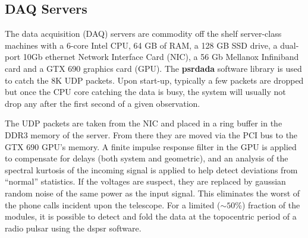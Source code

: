 \subsection {DAQ Servers}

The data acquisition (DAQ) servers are commodity off the shelf server-class machines with a 6-core Intel CPU, 64 GB of RAM, a 128 GB SSD drive, a dual-port 10Gb ethernet Network Interface Card (NIC), a 56 Gb Mellanox Infiniband card and a GTX 690 graphics card (GPU). The {\bf psrdada} software library is used to catch the 8K UDP packets. Upon start-up, typically a few packets are dropped but once the CPU core catching the data is busy, the system will usually not drop any after the first second of a given observation. 

The UDP packets are taken from the NIC and placed in a ring buffer
in the DDR3 memory of the server. From there they are moved via the PCI bus to the GTX 690 GPU's memory. A finite impulse response filter in the GPU is applied to compensate for delays (both system and geometric), and an analysis of the spectral kurtosis of the incoming signal is applied to help detect deviations from ``normal'' statistics. If the voltages are suspect, they are replaced by gaussian random noise of the same power as the input signal. This eliminates the worst of the phone calls incident upon the telescope. For a limited ($\sim50$\%) fraction of the modules, it is possible to detect and fold the data at the topocentric period of a radio pulsar using the {\sc dspsr} software.

